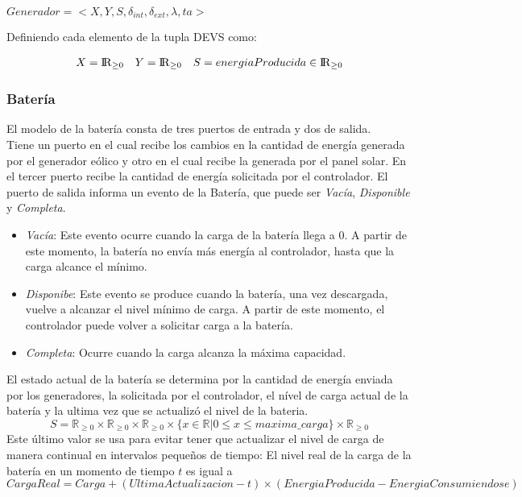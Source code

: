 $Generador = <X,Y,S,\delta_{int}, \delta_{ext}, \lambda, ta>$

Definiendo cada elemento de la tupla DEVS como:

\begin{align*}
X &= {\rm I\!R}_{\geq0} & Y &= {\rm I\!R}_{\geq0} & S &= energiaProducida \in {\rm I\!R}_{\geq 0} \\
\end{align*}




\subsubsection{Batería}
El modelo de la bater\'ia consta de tres puertos de entrada y dos de salida.\\
Tiene un puerto en el cual recibe los cambios en la cantidad de energ\'ia generada
por el generador eólico y otro en el cual recibe la generada por el panel solar.
En el tercer puerto recibe la cantidad de energía solicitada por el controlador.
El puerto de salida informa un evento de la Batería, que puede ser \emph{Vacía},
\emph{Disponible} y \emph{Completa}.
\begin{itemize}
    \item \emph{Vacía}: Este evento ocurre cuando la carga de la batería llega a 0. 
    A partir de este momento, la batería no envía más energía al controlador, hasta
    que la carga alcance el mínimo.
    \item \emph{Disponibe}: Este evento se produce cuando la batería, una vez
    descargada, vuelve a alcanzar el nivel mínimo de carga. A partir de este
    momento, el controlador puede volver a solicitar carga a la batería.
    \item \emph{Completa}: Ocurre cuando la carga alcanza la máxima capacidad.
\end{itemize}

El estado actual de la batería se determina por la cantidad de energía enviada
por los generadores, la solicitada por el controlador, el nível de carga actual
de la batería y la ultima vez que se actualizó el nivel de la bateria.
$$S = \mathbb{R}_{\geq 0} \times \mathbb{R}_{\geq 0} \times \mathbb{R}_{\geq 0} \times \{x \in \mathbb{R} | 0 \leq x \leq maxima\_carga \} \times \mathbb{R}_{\geq 0}$$
Este último valor se usa para evitar tener que actualizar el nivel de carga
de manera continual en intervalos pequeños de tiempo: El nivel real de la carga de
la batería en un momento de tiempo $t$ es igual a \\
$$CargaReal = Carga+(UltimaActualizacion - t)\times(EnergiaProducida - EnergiaConsumiendose)$$

